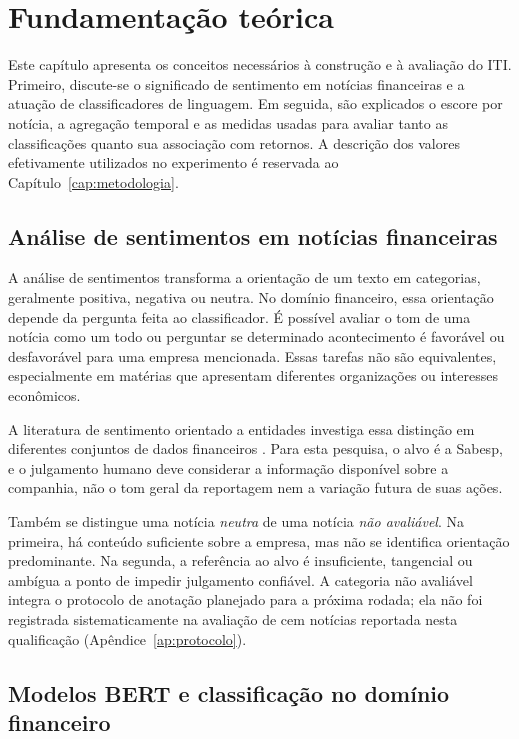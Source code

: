 \chapter{Fundamentação teórica}
\label{cap:fundamentacao}

Este capítulo apresenta os conceitos necessários à construção e à avaliação do ITI. Primeiro, discute-se o significado de sentimento em notícias financeiras e a atuação de classificadores de linguagem. Em seguida, são explicados o escore por notícia, a agregação temporal e as medidas usadas para avaliar tanto as classificações quanto sua associação com retornos. A descrição dos valores efetivamente utilizados no experimento é reservada ao Capítulo~\ref{cap:metodologia}.

\section{Análise de sentimentos em notícias financeiras}

A análise de sentimentos transforma a orientação de um texto em categorias, geralmente positiva, negativa ou neutra. No domínio financeiro, essa orientação depende da pergunta feita ao classificador. É possível avaliar o tom de uma notícia como um todo ou perguntar se determinado acontecimento é favorável ou desfavorável para uma empresa mencionada. Essas tarefas não são equivalentes, especialmente em matérias que apresentam diferentes organizações ou interesses econômicos.

A literatura de sentimento orientado a entidades investiga essa distinção em diferentes conjuntos de dados financeiros \cite{cortis2017semeval5,yuan2020target,sinha2022sentfin,tang2023finentity}. Para esta pesquisa, o alvo é a Sabesp, e o julgamento humano deve considerar a informação disponível sobre a companhia, não o tom geral da reportagem nem a variação futura de suas ações.

Também se distingue uma notícia \emph{neutra} de uma notícia \emph{não avaliável}. Na primeira, há conteúdo suficiente sobre a empresa, mas não se identifica orientação predominante. Na segunda, a referência ao alvo é insuficiente, tangencial ou ambígua a ponto de impedir julgamento confiável. A categoria não avaliável integra o protocolo de anotação planejado para a próxima rodada; ela não foi registrada sistematicamente na avaliação de cem notícias reportada nesta qualificação (Apêndice~\ref{ap:protocolo}).

\section{Modelos BERT e classificação no domínio financeiro}

